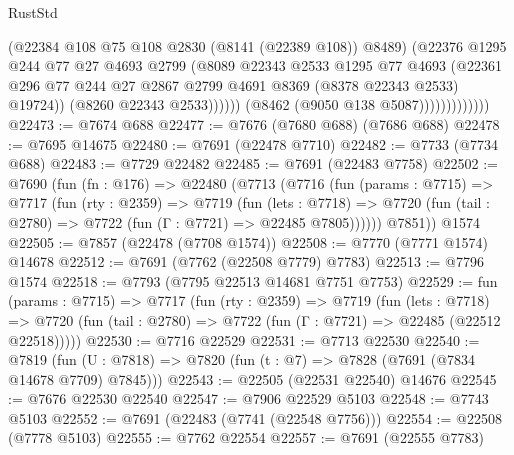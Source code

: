 \begin{lexlean}{RustStd}
\begin{coremodule}
                                  (@22384 @108 @75 @108 @2830 (@8141 (@22389 @108)) @8489)
                                  (@22376
                                    @1295
                                    @244
                                    @77
                                    @27
                                    @4693
                                    @2799
                                    (@8089
                                      @22343
                                      @2533
                                      @1295
                                      @77
                                      @4693
                                      (@22361
                                        @296
                                        @77
                                        @244
                                        @27
                                        @2867
                                        @2799
                                        @4691
                                        @8369
                                        (@8378 @22343 @2533)
                                        @19724))
                                    (@8260 @22343 @2533))))))
                          (@8462 (@9050 @138 @5087)))))))))))))
@22473 := @7674 @688
@22477 := @7676 (@7680 @688) (@7686 @688)
@22478 := @7695 @14675
@22480 := @7691 (@22478 @7710)
@22482 := @7733 (@7734 @688)
@22483 := @7729 @22482
@22485 := @7691 (@22483 @7758)
@22502 := @7690
    (fun (fn : @176) =>
    @22480
      (@7713
        (@7716
          (fun (params : @7715) =>
          @7717
            (fun (rty : @2359) =>
            @7719
              (fun (lets : @7718) =>
              @7720 (fun (tail : @2780) => @7722 (fun (Γ : @7721) => @22485 @7805))))))
        @7851))
    @1574
@22505 := @7857 (@22478 (@7708 @1574))
@22508 := @7770 (@7771 @1574) @14678
@22512 := @7691 (@7762 (@22508 @7779) @7783)
@22513 := @7796 @1574
@22518 := @7793 (@7795 @22513 @14681 @7751 @7753)
@22529 := fun (params : @7715) =>
  @7717
    (fun (rty : @2359) =>
    @7719
      (fun (lets : @7718) =>
      @7720 (fun (tail : @2780) => @7722 (fun (Γ : @7721) => @22485 (@22512 @22518)))))
@22530 := @7716 @22529
@22531 := @7713 @22530
@22540 := @7819
    (fun (U : @7818) => @7820 (fun (t : @7) => @7828 (@7691 (@7834 @14678 @7709) @7845)))
@22543 := @22505 (@22531 @22540) @14676
@22545 := @7676 @22530 @22540
@22547 := @7906 @22529 @5103
@22548 := @7743 @5103
@22552 := @7691 (@22483 (@7741 (@22548 @7756)))
@22554 := @22508 (@7778 @5103)
@22555 := @7762 @22554
@22557 := @7691 (@22555 @7783)

\end{coremodule}
\end{lexlean}
